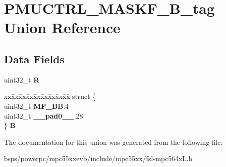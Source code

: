 \hypertarget{unionPMUCTRL__MASKF__32B__tag}{}\section{P\+M\+U\+C\+T\+R\+L\+\_\+\+M\+A\+S\+K\+F\+\_\+B\+\_\+tag Union Reference}
\label{unionPMUCTRL__MASKF__32B__tag}
\subsection*{Data Fields}
\begin{DoxyCompactItemize}
\item 
\mbox{\label{unionPMUCTRL__MASKF__32B__tag_a58081a68673691f0eb496b2fc6e8cdb9}} 
uint32\+\_\+t {\bfseries R}
\item 
\mbox{\label{unionPMUCTRL__MASKF__32B__tag_a8427dcf3e3bc41076f4730ae93e4d184}} 
\begin{tabbing}
xx\=xx\=xx\=xx\=xx\=xx\=xx\=xx\=xx\=\kill
struct \{\\
\>uint32\_t {\bfseries MF\_BB}:4\\
\>uint32\_t {\bfseries \_\_pad0\_\_}:28\\
\} {\bfseries B}\\

\end{tabbing}\end{DoxyCompactItemize}


The documentation for this union was generated from the following file\+:\begin{DoxyCompactItemize}
\item 
bsps/powerpc/mpc55xxevb/include/mpc55xx/fsl-\/mpc564x\+L.\+h\end{DoxyCompactItemize}
